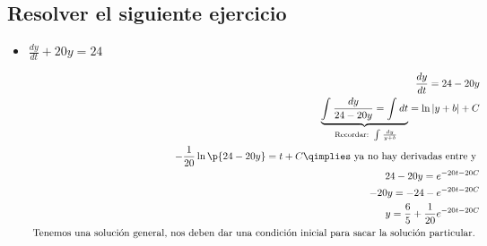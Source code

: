 \subsection{Resolver el siguiente ejercicio}
\begin{itemize}
    \item $\displaystyle \frac{d y}{d t} +20y=24$ 
        \begin{center}
           \begin{align*}
               \frac{d y}{d t} = 24 - 20y \\ 
               \underbrace{\int_{}^{} \frac{dy}{24-20y} = \int_{}^{}dt}_{\text{ Recordar: } \int_{}^{}\frac{d y}{y + b} } = \ln|y+b|+C   \\ 
               -\frac{1}{20}\ln\p{ 24-20y } = t + C \qimplies \text{ ya no hay derivadas entre y } \\
               24-20y = e^{-20t-20C} \\ 
               -20y = -24 - e^{-20t-20C} \\ 
               y = \frac{6}{5}+\frac{1}{20}e^{-20t-20C} \\  
               \text{ Tenemos una solución general, nos deben dar una condición inicial para sacar la solución particular. } \\ 
           \end{align*}
        \end{center}
\end{itemize}
